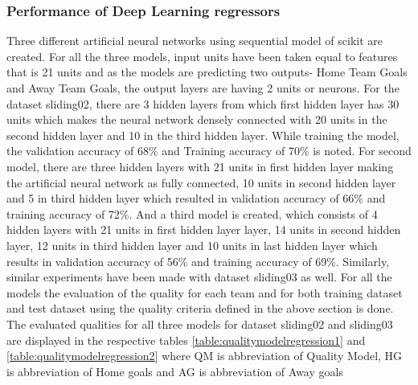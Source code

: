 \subsubsection{Performance of Deep Learning regressors}
Three different artificial neural networks using sequential model of scikit are created. For all the three models, input units have been taken equal to features that is 21 units and as the models are predicting two outputs- Home Team Goals and Away Team Goals, the output layers are having 2 units or neurons. For the dataset sliding02, there are 3 hidden layers from which first hidden layer has 30 units which makes the neural network densely connected with 20 units in the second hidden layer and 10 in the third hidden layer. While training the model, the validation accuracy of 68\% and Training accuracy of 70\% is noted. For second model, there are three hidden layers with 21 units in first hidden layer making the artificial neural network as fully connected, 10 units in second hidden layer and 5 in third hidden layer which resulted in validation accuracy of 66\% and training accuracy of 72\%. 
And a third model is created, which consists of 4 hidden layers with 21 units in first hidden layer layer, 14 units in second hidden layer, 12 units in third hidden layer and 10 units in last hidden layer which results in validation accuracy of 56\% and training accuracy of 69\%.\newline
Similarly, similar experiments have been made with dataset sliding03 as well. For all the models the evaluation of the quality for each team and for both training dataset and test dataset using the quality criteria defined in the above section is done. The evaluated qualities for all three models for dataset sliding02 and sliding03 are displayed in the respective tables \autoref{table:qualitymodelregression1} and \autoref{table:qualitymodelregression2} where QM is abbreviation of Quality Model, HG is abbreviation of Home goals and AG is abbreviation of Away goals\newline

\begin{table}
\centering
{}
\caption{ Quality Model for models with different hidden units for dataset sliding02}
\label{table:qualitymodelregression1}
\end{table}



